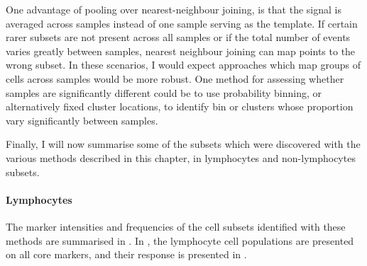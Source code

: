 One advantage of pooling over nearest-neighbour joining, is that the signal is averaged across samples instead of one sample serving as the template.
If certain rarer subsets are not present across all samples or if the total number of events varies greatly between samples, nearest neighbour joining can map points to the wrong subset.
In these scenarios, I would expect approaches which map groups of cells across samples would be more robust.
One method for assessing whether samples are significantly different could be to use probability binning, or alternatively fixed cluster locations, to identify bin or clusters whose proportion vary significantly between samples.



Finally, I will now summarise some of the subsets which were discovered with the various methods described in this chapter, in lymphocytes and non-lymphocytes subsets.

\clearpage

\paragraph{Lymphocytes}

The marker intensities and frequencies of the cell subsets identified with these methods are summarised in .
In , the lymphocyte cell populations are presented on all core markers, and their response is presented in .

